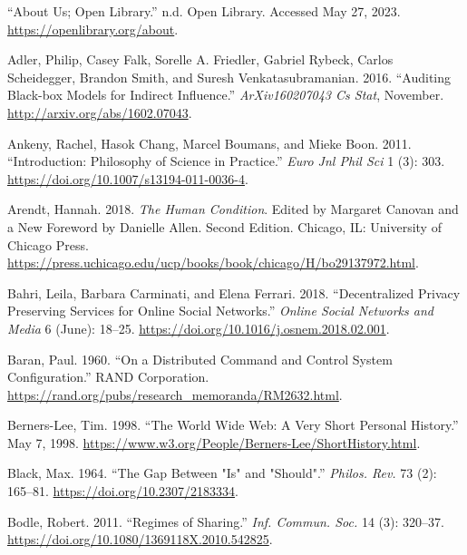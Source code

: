 \documentclass[
  a4paper,
]{book}
\newlength{\cslhangindent}
\newlength{\cslentryspacingunit} %
\newenvironment{CSLReferences}[2] %
 {%
  \setlength{\parindent}{0pt}
  \ifodd #1
  \let\oldpar\par
  \def\par{\hangindent=\cslhangindent\oldpar}
  \fi
  \setlength{\parskip}{#2\cslentryspacingunit}
 }%
 {}
\begin{document}
\hypertarget{refs}{}
\begin{CSLReferences}{1}{0}
\hypertarget{ref-AboutOpenLibrary}{}
{``About {Us}; {Open Library}.''} n.d. {Open Library}. Accessed May 27, 2023. \url{https://openlibrary.org/about}.

\hypertarget{ref-adlerAuditingBlackboxModels2016}{}
Adler, Philip, Casey Falk, Sorelle A. Friedler, Gabriel Rybeck, Carlos Scheidegger, Brandon Smith, and Suresh Venkatasubramanian. 2016. {``Auditing {Black-box Models} for {Indirect Influence}.''} \emph{ArXiv160207043 Cs Stat}, November. \url{http://arxiv.org/abs/1602.07043}.

\hypertarget{ref-ankenyIntroductionPhilosophyScience2011}{}
Ankeny, Rachel, Hasok Chang, Marcel Boumans, and Mieke Boon. 2011. {``Introduction: Philosophy of Science in Practice.''} \emph{Euro Jnl Phil Sci} 1 (3): 303. \url{https://doi.org/10.1007/s13194-011-0036-4}.

\hypertarget{ref-arendtHumanCondition2018}{}
Arendt, Hannah. 2018. \emph{The {Human Condition}}. Edited by Margaret Canovan and a New Foreword by Danielle Allen. Second Edition. {Chicago, IL}: {University of Chicago Press}. \url{https://press.uchicago.edu/ucp/books/book/chicago/H/bo29137972.html}.

\hypertarget{ref-bahriDecentralizedPrivacyPreserving2018}{}
Bahri, Leila, Barbara Carminati, and Elena Ferrari. 2018. {``Decentralized Privacy Preserving Services for {Online Social Networks}.''} \emph{Online Social Networks and Media} 6 (June): 18--25. \url{https://doi.org/10.1016/j.osnem.2018.02.001}.

\hypertarget{ref-baranDistributedCommandControl1960}{}
Baran, Paul. 1960. {``On a {Distributed Command} and {Control System Configuration}.''} {RAND Corporation}. \url{https://rand.org/pubs/research_memoranda/RM2632.html}.

\hypertarget{ref-berners-leeWorldWideWeb1998}{}
Berners-Lee, Tim. 1998. {``The {World Wide Web}: {A} Very Short Personal History.''} May 7, 1998. \url{https://www.w3.org/People/Berners-Lee/ShortHistory.html}.

\hypertarget{ref-blackGapShould1964}{}
Black, Max. 1964. {``The {Gap Between} "{Is}" and "{Should}".''} \emph{Philos. Rev.} 73 (2): 165--81. \url{https://doi.org/10.2307/2183334}.

\hypertarget{ref-bodleRegimesSharing2011}{}
Bodle, Robert. 2011. {``Regimes of {Sharing}.''} \emph{Inf. Commun. Soc.} 14 (3): 320--37. \url{https://doi.org/10.1080/1369118X.2010.542825}.


\end{CSLReferences}
\end{document}
